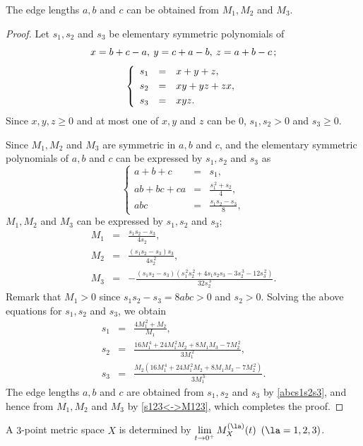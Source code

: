 \begin{lemma}\label{abc<-M1M2M3}
The edge lengths $a,b$ and $c$ can be obtained from $M_1,M_2$ and $M_3$. 
\end{lemma}

\begin{proof}
Let $s_1, s_2$ and $s_3$ be elementary symmetric polynomials of 
\begin{equation}\label{xyz<->abc}
x=b+c-a, \> y=c+a-b, \> z=a+b-c \,; \notag
\end{equation}
%
\begin{equation}\label{s123<->xyz}
\left\{\begin{array}{rcl}
s_1&=&x+y+z,\\[1mm]
s_2&=&xy+yz+zx, \\[1mm]
s_3&=&xyz.
\end{array}\right. \notag
\end{equation}
%
Since $x,y,z\ge0$ and at most one of $x,y$ and $z$ can be $0$, $s_1,s_2>0$ and $s_3\ge0$. 
%

Since $M_1,M_2$ and $M_3$ are symmetric in $a,b$ and $c$, and the elementary symmetric polynomials of $a, b$ and $c$ can be expressed by $s_1, s_2$ and $s_3$ as 
\begin{equation}\label{abcs1s2s3}
\left\{\begin{array}{rcl}
a+b+c&=&s_1, \\[2mm]
ab+bc+ca&=&\displaystyle \frac{s_1^{\,2}+s_2}4, \\[4mm]
abc&=&\displaystyle \frac{s_1s_2-s_3}8,
\end{array}\right.
\end{equation}
%
$M_1,M_2$ and $M_3$ can be expressed by $s_1, s_2$ and $s_3$; 
\[%
\begin{array}{rcl}
M_1&=&\displaystyle \frac{s_1s_2-s_3}{4s_2},\\[4mm]
%
M_2&=&\displaystyle \frac{(s_1s_2-s_3)s_3}{4s_2^{\,2}},\\[4mm]
%
M_3&=&\displaystyle -\frac{(s_1s_2-s_3)\left(s_1^{\,2}s_2^{\,2}+4s_1s_2s_3-3s_2^{\,3}-12s_3^{\,2}\right)}{32s_2^{\,3}}.
\end{array}%
\]
%
Remark that $M_1>0$ since $s_1s_2-s_3=8abc>0$ and $s_2>0$. 
Solving the above equations for $s_1, s_2$ and $s_3$, we obtain 
%
\begin{equation}\label{s123<->M123}
\begin{array}{rcl}
s_1&=&\displaystyle \frac{4M_1^{\,2}+M_2}{M_1}, \\[6mm]
%
s_2&=&\displaystyle \frac{16M_1^{\,4}+24M_1^{\,2}M_2+8M_1M_3-7M_2^{\,2}}{3M_1^{\,2}}, \\[6mm]
%
s_3&=&\displaystyle \frac{M_2\left(16M_1^{\,4}+24M_1^{\,2}M_2+8M_1M_3-7M_2^{\,2}\right)}{3M_1^{\,3}}.
\end{array}
\end{equation}
%
The edge lengths $a,b$ and $c$ are obtained from $s_1, s_2$ and $s_3$ by \eqref{abcs1s2s3}, and hence from $M_1,M_2$ and $M_3$ by \eqref{s123<->M123}, which completes the proof. 
\end{proof}

\begin{corollary}
A $3$-point metric space $X$ is determined by  $\displaystyle \lim_{t\to 0^+}M^{(\la)}_X(t)$ $(\la=1,2,3)$. 
\end{corollary}
